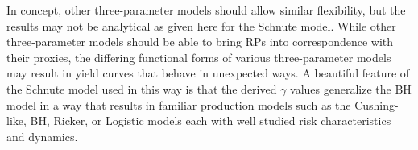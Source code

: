 %
In concept, other three-parameter models should allow similar flexibility, but 
the results may not be analytical as given here for the Schnute model. While 
other three-parameter models should be able to bring RPs into correspondence 
with their proxies, the differing functional forms of various three-parameter 
models may result in yield curves that behave in unexpected ways. A beautiful 
feature of the Schnute model used in this way is that the derived $\gamma$ 
values generalize the BH model in a way that results in familiar production models %
such as the Cushing-like, BH, Ricker, or Logistic models each with well studied risk 
characteristics and dynamics. 


